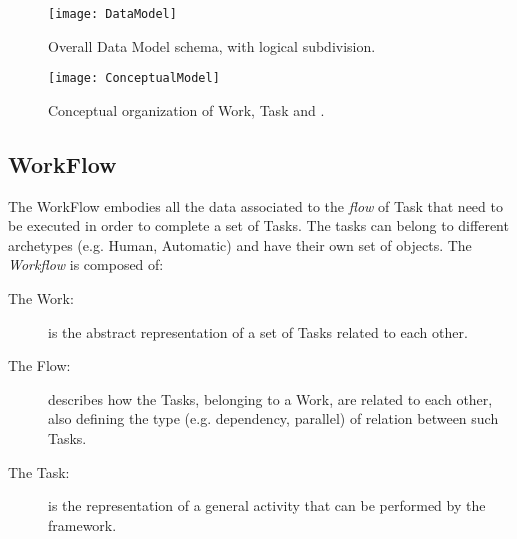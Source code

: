 \begin{figure}[htb]
    \centering
    \texttt{[image: DataModel]}
    \caption{Overall Data Model schema, with logical subdivision.}
    \label{fig:data-model}
\end{figure}
\begin{figure}[htb]
    \centering
    \texttt{[image: ConceptualModel]}
    \caption{Conceptual organization of Work, Task and \utask{}.}
    \label{fig:conceptual-model}
\end{figure}






\subsection{WorkFlow}
The WorkFlow embodies all the data associated to the \emph{flow} of Task
that need to be executed in order to complete a set of Tasks. The tasks can belong
to different archetypes (e.g. Human, Automatic) and have their own set of objects.
The \emph{Workflow} is composed of:
\begin{description}
    \item[The Work:] is the abstract representation of a set of Tasks related
    to each other.
    \item[The Flow:] describes how the Tasks, belonging to a Work, are related
    to each other, also defining the type (e.g. dependency, parallel) of relation
    between such Tasks. 
    \item[The Task:] is the representation of a general activity that can be
    performed by the framework.
\end{description}

